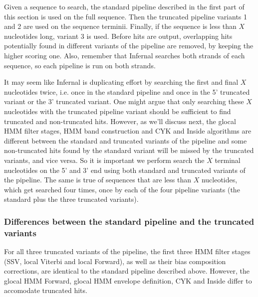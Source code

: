 \begin{sreoutput}
\begin{enumerate}
\end{enumerate}

Given a sequence to search, the standard pipeline described in the
first part of this section is used on the full sequence. Then the
truncated pipeline variants 1 and 2 are used on the sequence
terminii. Finally, if the sequence is less than $X$ nucleotides long,
variant 3 is used. Before hits are output, overlapping hits
potentially found in different variants of the pipeline are removed,
by keeping the higher scoring one. Also, remember that Infernal
searches both strands of each sequence, so each pipeline is run on
both strands.

It may seem like Infernal is duplicating effort by searching the first
and final $X$ nucleotides twice, i.e. once in the standard pipeline and
once in the 5' truncated variant or the 3' truncated variant. One
might argue that only searching these $X$ nucleotides with the truncated
pipeline variant should be sufficient to find truncated and
non-truncated hits. However, as we'll discuss next, the glocal HMM
filter stages, HMM band construction and CYK and Inside algorithms are
different between the standard and truncated variants of the pipeline
and some non-truncated hits found by the standard variant will be
missed by the truncated variants, and vice versa. So it is important
we perform search the $X$ terminal nucleotides on the 5' and 3' end
using both standard and truncated variants of the pipeline. The same
is true of sequences that are less than $X$ nucleotides, which get
searched four times, once by each of the four pipeline variants (the
standard plus the three truncated variants).

\subsubsection{Differences between the standard pipeline and the
  truncated variants}

For all three truncated variants of the pipeline, the first three HMM
filter stages (SSV, local Viterbi and local Forward), as well as their
bias composition corrections, are identical to the standard pipeline
described above. However, the glocal HMM Forward, glocal HMM envelope
definition, CYK and Inside differ to accomodate truncated hits.


\end{sreoutput}
